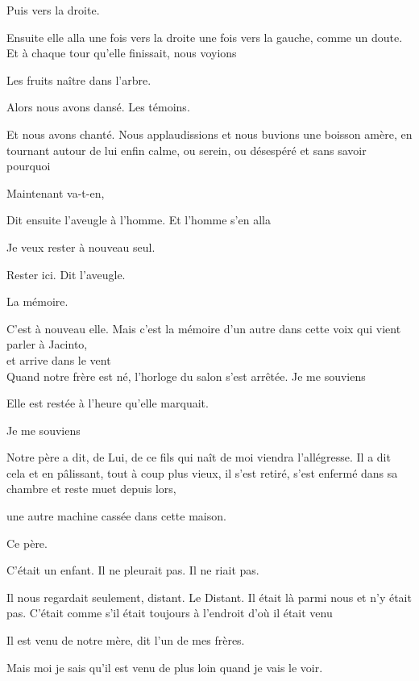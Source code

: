 Puis vers la droite.

Ensuite elle alla une fois vers la droite une fois vers la gauche, comme
un doute. Et à chaque tour qu'elle finissait, nous voyions

Les fruits naître dans l'arbre.

Alors nous avons dansé. Les témoins.

Et nous avons chanté. Nous applaudissions et nous buvions une boisson
amère, en tournant autour de lui enfin calme, ou serein, ou désespéré et
sans savoir pourquoi

\breakk

\vspace*{4cm}

Maintenant va-t-en,

Dit ensuite l'aveugle à l'homme. Et l'homme s'en alla

Je veux rester à nouveau seul.

Rester ici. Dit l'aveugle.

\breakk

\vspace*{4cm}

La mémoire.

C'est à nouveau elle. Mais c'est la mémoire d'un autre dans cette voix
qui vient parler à Jacinto,\\

et arrive dans le vent\\

Quand notre frère est né, l'horloge du salon s'est arrêtée. Je me
souviens

Elle est restée à l'heure qu'elle marquait.

Je me souviens

Notre père a dit, de Lui, de ce fils qui naît de moi viendra
l'allégresse. Il a dit cela et en pâlissant, tout à coup plus vieux, il
s'est retiré, s'est enfermé dans sa chambre et reste muet depuis lors,

une autre machine cassée dans cette maison.

Ce père.

C'était un enfant. Il ne pleurait pas. Il ne riait pas.

Il nous regardait seulement, distant. Le Distant. Il était là parmi nous
et n'y était pas. C'était comme s'il était toujours à l'endroit d'où il
était venu

Il est venu de notre mère, dit l'un de mes frères.

Mais moi je sais qu'il est venu de plus loin quand je vais le voir.

